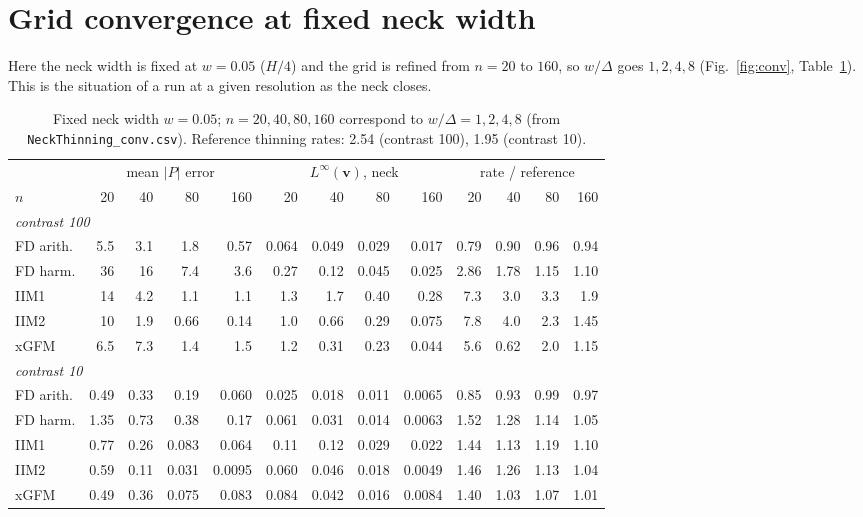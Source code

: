 \documentclass[11pt,a4paper]{article}
\newcommand{\code}[1]{\texttt{#1}}
\begin{document}
\section{Grid convergence at fixed neck width}
Here the neck width is fixed at $w = 0.05$ ($H/4$) and the grid is refined from $n = 20$ to
$160$, so $w/\Delta$ goes $1, 2, 4, 8$ (Fig.~\ref{fig:conv}, Table~\ref{tab:conv}). This is the
situation of a run at a given resolution as the neck closes.

\begin{table}[h]
\centering\small
\begin{tabular}{l rrrr @{\hspace{1.2em}} rrrr @{\hspace{1.2em}} rrrr}
\toprule
 & \multicolumn{4}{c}{mean $|P|$ error} & \multicolumn{4}{c}{$L^\infty(\mathbf{v})$, neck} & \multicolumn{4}{c}{rate / reference}\\
$n$ & 20 & 40 & 80 & 160 & 20 & 40 & 80 & 160 & 20 & 40 & 80 & 160\\
\midrule
\multicolumn{13}{l}{\emph{contrast 100}}\\
FD arith. & 5.5 & 3.1 & 1.8 & 0.57 & 0.064 & 0.049 & 0.029 & 0.017 & 0.79 & 0.90 & 0.96 & 0.94\\
FD harm.  & 36  & 16  & 7.4 & 3.6  & 0.27  & 0.12  & 0.045 & 0.025 & 2.86 & 1.78 & 1.15 & 1.10\\
IIM1      & 14  & 4.2 & 1.1 & 1.1  & 1.3   & 1.7   & 0.40  & 0.28  & 7.3  & 3.0  & 3.3  & 1.9\\
IIM2      & 10  & 1.9 & 0.66 & 0.14 & 1.0  & 0.66  & 0.29  & 0.075 & 7.8  & 4.0  & 2.3  & 1.45\\
xGFM      & 6.5 & 7.3 & 1.4 & 1.5  & 1.2   & 0.31  & 0.23  & 0.044 & 5.6  & 0.62 & 2.0  & 1.15\\
\midrule
\multicolumn{13}{l}{\emph{contrast 10}}\\
FD arith. & 0.49 & 0.33 & 0.19 & 0.060 & 0.025 & 0.018 & 0.011 & 0.0065 & 0.85 & 0.93 & 0.99 & 0.97\\
FD harm.  & 1.35 & 0.73 & 0.38 & 0.17 & 0.061 & 0.031 & 0.014 & 0.0063 & 1.52 & 1.28 & 1.14 & 1.05\\
IIM1      & 0.77 & 0.26 & 0.083 & 0.064 & 0.11 & 0.12 & 0.029 & 0.022 & 1.44 & 1.13 & 1.19 & 1.10\\
IIM2      & 0.59 & 0.11 & 0.031 & 0.0095 & 0.060 & 0.046 & 0.018 & 0.0049 & 1.46 & 1.26 & 1.13 & 1.04\\
xGFM      & 0.49 & 0.36 & 0.075 & 0.083 & 0.084 & 0.042 & 0.016 & 0.0084 & 1.40 & 1.03 & 1.07 & 1.01\\
\bottomrule
\end{tabular}
\caption{Fixed neck width $w = 0.05$; $n = 20, 40, 80, 160$ correspond to $w/\Delta = 1, 2, 4, 8$
  (from \code{NeckThinning\_conv.csv}). Reference thinning rates: 2.54 (contrast 100),
  1.95 (contrast 10).}
\label{tab:conv}
\end{table}
\end{document}
